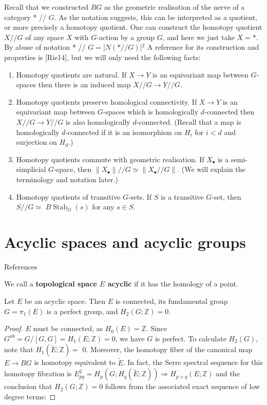 Recall that we constructed $B G$ as the geometric realisation of the nerve of a category * // $G$. As the notation suggests, this can be interpreted as a quotient, or more precisely a homotopy quotient. One can construct the homotopy quotient $X / / G$ of any space $X$ with $G$-action by a group $G$, and here we just take $X=*$. By abuse of notation * // $G=|N(* / / G)|{ }^2$ A reference for its construction and properties is [Rie14], but we will only need the following facts:

\begin{enumerate}
    \item Homotopy quotients are natural. If $X \rightarrow Y$ is an equivariant map between $G$-spaces then there is an induced map $X / / G \rightarrow Y / / G$.
    \item Homotopy quotients preserve homological connectivity. If $X \rightarrow Y$ is an equivariant map between $G$-spaces which is homologically $d$-connected then $X / / G \rightarrow Y / / G$ is also homologically $d$-connected. (Recall that a map is homologically $d$-connected if it is an isomorphism on $H_i$ for $i<d$ and surjection on $H_d$.)
    \item Homotopy quotients commute with geometric realisation. If $X_{\bullet}$ is a semi-simplicial $G$-space, then $\left\|X_{\bullet}\right\| / / G \simeq\left\|X_{\bullet} / / G\right\|$. (We will explain the terminology and notation later.)
    \item Homotopy quotients of transitive $G$-sets. If $S$ is a transitive $G$-set, then $S / / G \simeq$ $B \operatorname{Stab}_G(s)$ for any $s \in S$.
\end{enumerate}


\section{Acyclic spaces and acyclic groups}

References \cite{karoubiContemporaryDevelopmentsAlgebraic2003}

 We call a \textbf{topological space $E$ acyclic} if it has the homology of a point.

\begin{lemm}
    Let $E$ be an acyclic space. Then $E$ is connected, its fundamental group $G=\pi_1(E)$ is a perfect group, and $H_2(G ; \mathbb{Z})=0$.
\end{lemm}
\begin{proof}
    
$E$ must be connected, as $H_0(E)=\mathbb{Z}$. Since $G^{ab} =G /[G, G]=H_1(E ; \mathbb{Z})=0$, we have $G$ is perfect. To calculate $H_2(G)$, note that $H_1(\tilde{E} ; \mathbb{Z})=$ 0. Moreover, the homotopy fiber of the canonical map $E \rightarrow B G$ is homotopy equivalent to $\tilde{E}$. In fact, the Serre spectral sequence for this homotopy fibration is $E_{p q}^2=H_p\left(G ; H_q(\tilde{E} ; \mathbb{Z})\right) \Rightarrow H_{p+q}(E ; \mathbb{Z})$ and the conclusion that $H_2(G ; \mathbb{Z})=0$ follows from the associated exact sequence of low degree terms:
\end{proof}

